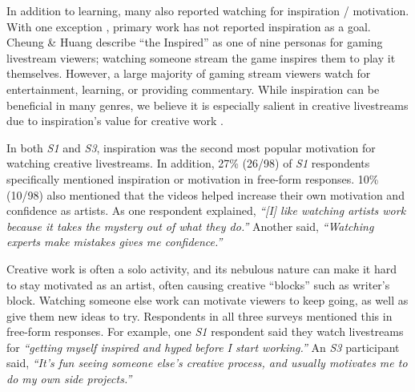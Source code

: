 In addition to learning, many also reported watching for inspiration / motivation. With one exception \cite{Cheung2011}, primary work has not reported inspiration as a goal. Cheung \& Huang \cite{Cheung2011} describe ``the Inspired'' as one of nine personas for gaming livestream viewers; watching someone stream the game inspires them to play it themselves. However, a large majority of gaming stream viewers watch for entertainment, learning, or providing commentary. While inspiration can be beneficial in many genres, we believe it is especially salient in creative livestreams due to inspiration's value for creative work \cite{Herring2009}.

In both \textit{S1} and \textit{S3}, inspiration was the second most popular motivation for watching creative livestreams. In addition, 27\% (26/98) of \textit{S1} respondents specifically mentioned inspiration or motivation in free-form responses. 10\% (10/98) also mentioned that the videos helped increase their own motivation and confidence as artists. As one respondent explained, \textit{``[I] like watching artists work because it takes the mystery out of what they do.''} Another said, \textit{``Watching experts make mistakes gives me confidence.''}

Creative work is often a solo activity, and its nebulous nature can make it hard to stay motivated as an artist, often causing creative ``blocks'' such as writer's block. Watching someone else work can motivate viewers to keep going, as well as give them new ideas to try. Respondents in all three surveys mentioned this in free-form responses. For example, one \textit{S1} respondent said they watch livestreams for \textit{``getting myself inspired and hyped before I start working.''} An \textit{S3} participant said, \textit{``It's fun seeing someone else's creative process, and usually motivates me to do my own side projects.''}






